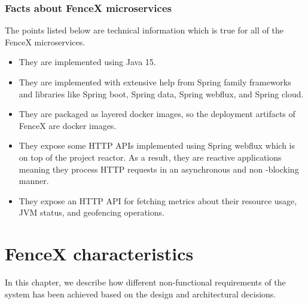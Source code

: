 \documentclass[a4]{report}
\begin{document}
    \subsection{Facts about FenceX microservices}
    The points listed below are technical information which is true for all of the FenceX microservices.

    \begin{itemize}
        \item They are implemented using Java 15.
        \item They are implemented with extensive help from Spring family frameworks and libraries like Spring boot,
        Spring data, Spring webflux, and Spring cloud.
        \item They are packaged as layered docker images, so the deployment artifacts of FenceX are docker images.
        \item They expose some HTTP APIs implemented using Spring webflux which is on top of the project reactor.
        As a result, they are reactive applications meaning they process HTTP requests in an asynchronous and non
        -blocking manner.
        \item They expose an HTTP API for fetching metrics about their resource usage, JVM status, and geofencing operations.
    \end{itemize}


    \chapter{FenceX characteristics}
    In this chapter, we describe how different non-functional requirements of the system has been achieved based on the
    design and architectural decisions.
\end{document}
